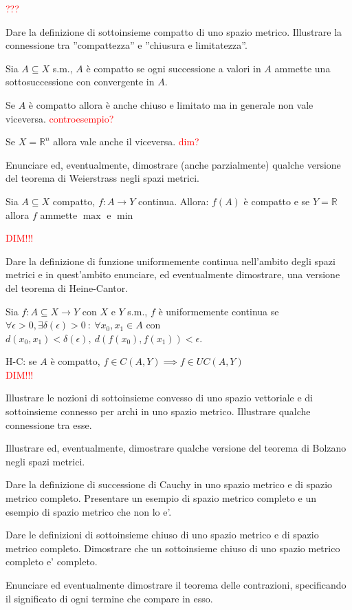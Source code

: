 \documentclass{exam}
\newcommand{\R}[0]{\mathbb{R}}
\newcommand{\err}[1]{\textcolor{red}{#1}}
\begin{document}
\begin{questions}
\begin{solution}
    \err{???}
\end{solution}

\question Dare la definizione di sottoinsieme compatto di uno spazio metrico. Illustrare la connessione tra ”compattezza” e ”chiusura e limitatezza”.
\begin{solution}
    Sia $A\subseteq X$ s.m., $A$ è compatto se ogni successione a valori in $A$ ammette una sottosuccessione con convergente in $A$.

    Se $A$ è compatto allora è anche chiuso e limitato ma in generale non vale viceversa. \err{controesempio?}

    Se $X = \R^n$ allora vale anche il viceversa. \err{dim?}
\end{solution}

\question Enunciare ed, eventualmente, dimostrare (anche parzialmente) qualche versione del teorema di Weierstrass negli spazi metrici.
\begin{solution}
    Sia $A\subseteq X$ compatto, $f: A \to Y$ continua.
    Allora: $f(A)$ è compatto e se $Y=\R$ allora $f$ ammette $\max$ e $\min$

    \err{DIM!!!}
    \end{solution}

\question Dare la definizione di funzione uniformemente continua nell'ambito degli spazi metrici e in quest'ambito enunciare, ed eventualmente dimostrare, una versione del teorema di Heine-Cantor.
\begin{solution}
    Sia $f: A\subseteq X \rightarrow Y$ con $X$ e $Y$ s.m., $f$ è uniformemente continua se $\forall \epsilon>0,  \exists \delta(\epsilon)>0 \ : \ \forall x_0,x_1 \in A$ con $ d(x_0,x_1)<\delta(\epsilon),\ d(f(x_0), f(x_1)) <\epsilon$.

    H-C: se $A$ è compatto, $f\in C(A,Y) \implies f \in UC(A,Y)$\\
    \err{DIM!!!}
\end{solution}

\question Illustrare le nozioni di sottoinsieme convesso di uno spazio vettoriale e di sottoinsieme connesso per archi in uno spazio metrico. Illustrare qualche connessione tra esse. 

\question Illustrare ed, eventualmente, dimostrare qualche versione del teorema di Bolzano negli spazi metrici.

\question Dare la definizione di successione di Cauchy in uno spazio metrico e di spazio metrico completo. Presentare un esempio di spazio metrico completo e un esempio di spazio metrico che non lo e’.

\question Dare le definizioni di sottoinsieme chiuso di uno spazio metrico e di spazio metrico completo. Dimostrare che un sottoinsieme chiuso di uno spazio metrico completo e’ completo.

\question Enunciare ed eventualmente dimostrare il teorema delle contrazioni, specificando il significato di ogni termine che compare in esso.
    
\end{questions}
\end{document}
